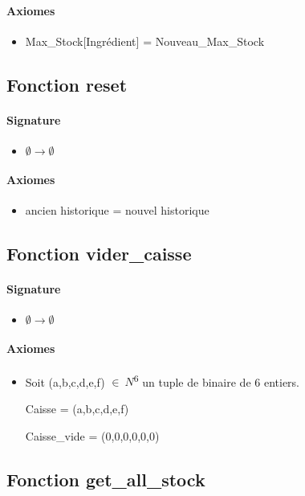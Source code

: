 \documentclass[]{article}
\begin{document}
\paragraph{Axiomes}
\begin{itemize}
\item
  Max\_Stock{[}Ingrédient{]} = Nouveau\_Max\_Stock
\end{itemize}

\subsection*{Fonction reset}
\paragraph{Signature}
\begin{itemize}
\item
  $  \emptyset \longrightarrow \emptyset $
\end{itemize}
\paragraph{Axiomes}
\begin{itemize}
\item
ancien historique = nouvel historique
\end{itemize}

\subsection*{Fonction vider\_caisse}
\paragraph{Signature}
\begin{itemize}
\item
  $  \emptyset \longrightarrow \emptyset$
\end{itemize}
\paragraph{Axiomes}
\begin{itemize}
\item
 Soit (a,b,c,d,e,f) \(\in \ N\)\textsuperscript{6} un tuple de
  binaire de 6 entiers.

Caisse = (a,b,c,d,e,f)

Caisse\_vide = (0,0,0,0,0,0)
\end{itemize}

\subsection*{Fonction get\_all\_stock}
\end{document}
